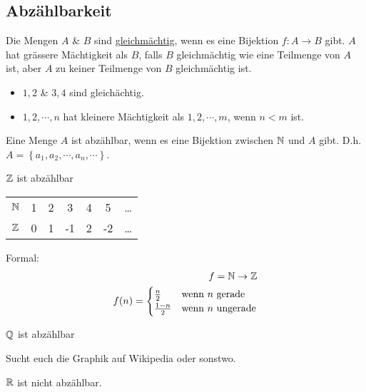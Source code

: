 \subsection{Abzählbarkeit}
\begin{Def}
  Die Mengen $A$ \& $B$ sind \underline{gleichmächtig}, wenn es eine Bijektion $f:A\to B$ gibt. $A$ hat grässere Mächtigkeit als $B$, falls $B$ gleichmächtig wie eine Teilmenge von $A$ ist, aber $A$ zu keiner Teilmenge von $B$ gleichmächtig ist.
\end{Def}
\begin{Bsp}
  \begin{itemize}
    \item ${1,2}$ \& ${3,4}$ sind gleichächtig.
    \item ${1,2,\cdots,n}$ hat kleinere Mächtigkeit als ${1,2,\cdots,m}$, wenn $n<m$ ist.
  \end{itemize}
\end{Bsp}
\begin{Def}
  Eine Menge $A$ ist abzählbar, wenn es eine Bijektion zwischen $\mathbb{N}$ und $A$ gibt. D.h. $A=\left\{ a_1,a_2,\cdots,a_n,\cdots \right\}$.
\end{Def}
\begin{Lem}
  $\mathbb{Z}$ ist abzählbar
\end{Lem}
\begin{Bew}
  \begin{tabular}{c|cccccc}
    $\mathbb{N}$ & 1 & 2 & 3 & 4 & 5 & \ldots \\
    $\mathbb{Z}$ & 0 & 1 & -1 & 2 & -2 & \ldots
  \end{tabular}
  Formal:
  \begin{align*}
    f=\mathbb{N}\to \mathbb{Z}\\
    f(n)=\begin{cases}
      \frac{n}{2} & \text{wenn $n$ gerade}\\
      \frac{1-n}{2} & \text{wenn $n$ ungerade}
    \end{cases}
  \end{align*}
\end{Bew}
\begin{Sat}
  $\mathbb{Q}$ ist abzählbar
\end{Sat}
\begin{Bew}
  Sucht euch die Graphik auf Wikipedia oder sonstwo.
\end{Bew}
\begin{Sat}
  $\mathbb{R}$ ist nicht abzählbar.
\end{Sat}

